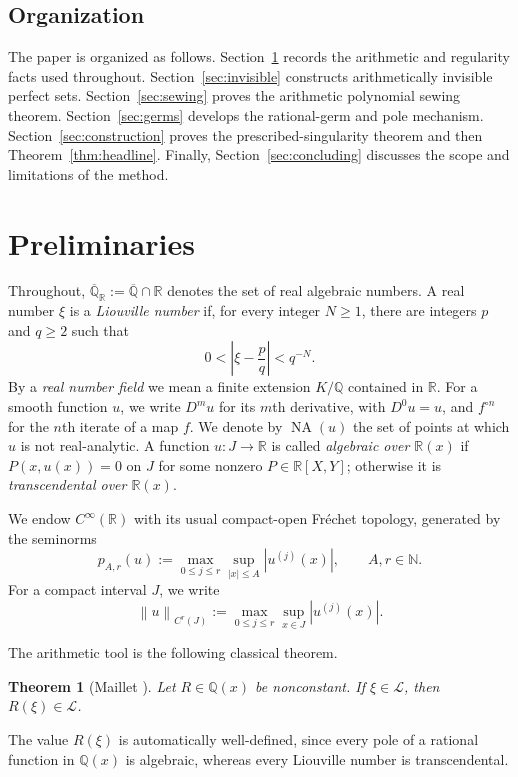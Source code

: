 \documentclass[11pt,reqno]{amsart}
\numberwithin{equation}{section}
\newtheorem{theorem}{Theorem}[section]
\theoremstyle{definition}
\theoremstyle{remark}
\newcommand{\R}{\mathbb R}
\newcommand{\Q}{\mathbb Q}
\newcommand{\N}{\mathbb N}
\newcommand{\Ralg}{\overline{\mathbb Q}_{\mathbb R}}
\newcommand{\Lio}{\mathscr L}
\newcommand{\NA}{\operatorname{NA}}
\newcommand{\norm}[1]{\left\lVert #1\right\rVert}
\newcommand{\abs}[1]{\left|#1\right|}
\begin{document}
\subsection*{Organization}

The paper is organized as follows. Section~\ref{sec:prelim} records the
arithmetic and regularity facts used throughout. Section~\ref{sec:invisible}
constructs arithmetically invisible perfect sets. Section~\ref{sec:sewing}
proves the arithmetic polynomial sewing theorem. Section~\ref{sec:germs}
develops the rational-germ and pole mechanism. Section~\ref{sec:construction}
proves the prescribed-singularity theorem and then
Theorem~\ref{thm:headline}. Finally, Section~\ref{sec:concluding} discusses the scope and limitations of the method.

\section{Preliminaries}\label{sec:prelim}

Throughout, $\Ralg:=\overline{\Q}\cap \R$ denotes the set of real algebraic numbers. A real number $\xi$ is a \emph{Liouville number} if, for every integer $N\geq1$, there are integers $p$ and $q\geq2$ such that
\[
0<\abs{\xi-\frac pq}<q^{-N}.
\]
By a \emph{real number field} we mean a finite extension $K/\Q$ contained in $\R$.
For a smooth function $u$, we write $D^m u$ for its $m$th derivative, with $D^0u=u$, and $f^{\circ n}$ for the $n$th iterate of a map $f$. We denote by $\NA(u)$ the set of points at which $u$ is not real-analytic. A function $u:J\to\R$ is called \emph{algebraic over $\R(x)$} if
$P(x,u(x))=0$ on $J$ for some nonzero $P\in\R[X,Y]$; otherwise it is
\emph{transcendental over $\R(x)$}.

We endow $C^\infty(\R)$ with its usual compact-open Fr\'echet topology, generated by the seminorms
\[
p_{A,r}(u)
:=\max_{0\leq j\leq r}\sup_{|x|\leq A}\abs{u^{(j)}(x)},
\qquad A,r\in\N.
\]
For a compact interval $J$, we write
\[
\norm{u}_{C^r(J)}
:=\max_{0\leq j\leq r}\sup_{x\in J}\abs{u^{(j)}(x)}.
\]

The arithmetic tool is the following classical theorem.

\begin{theorem}[Maillet {\cite[Chap.~III, Th\'eor\`eme~I$_3$
and Corollaire, pp.~32--33]{Maillet1906}}]\label{thm:maillet}
Let $R\in\Q(x)$ be nonconstant. If $\xi\in\Lio$, then $R(\xi)\in\Lio$.
\end{theorem}

The value $R(\xi)$ is automatically well-defined, since every pole of
a rational function in $\Q(x)$ is algebraic, whereas every Liouville
number is transcendental.
\end{document}

